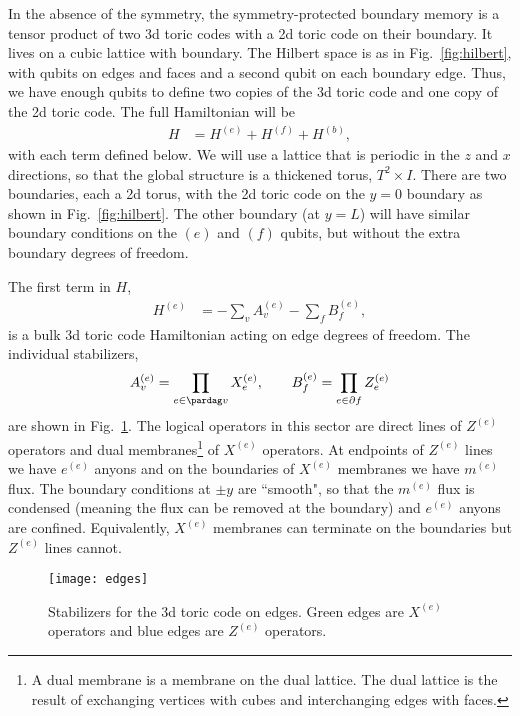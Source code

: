 In the absence of the symmetry, the symmetry-protected boundary memory is a tensor product of two 3d toric codes with a 2d toric code on their boundary. It lives on a cubic lattice with boundary. 
The Hilbert space is as in Fig.~\ref{fig:hilbert}, with qubits on edges and faces and a second qubit on each boundary edge. Thus, we have enough qubits to define two copies of the 3d toric code and one copy of the 2d toric code. The full Hamiltonian will be
\begin{align}
H &= H^{(e)} + H^{(f)} + H^{(b)}, \label{eq:fullH}
\end{align}
with each term defined below. We will use a lattice that is periodic in the $z$ and $x$ directions, so that the global structure is a thickened torus, $T^2\times I$. There are two boundaries, each a 2d torus, with the 2d toric code on the $y=0$ boundary as shown in Fig.~\ref{fig:hilbert}. The other boundary (at $y=L$) will have similar boundary conditions on the $(e)$ and $(f)$ qubits, but without the extra boundary degrees of freedom.

The first term in $H$,
\begin{align}
H^{(e)} &= -\sum_vA_v^{(e)} - \sum_f B_f^{(e)},
\end{align}
is a bulk 3d toric code Hamiltonian acting on edge degrees of freedom. The individual stabilizers,  
\begin{align}
A_v^{(e)} = \prod_{e\in\pardag v}X_e^{(e)},\qquad B_f^{(e)} = \prod_{e\in\partial f} Z_e^{(e)}
\end{align}
are shown in Fig.~\ref{fig:edges}.  The logical operators in this sector are direct lines of $Z^{(e)}$ operators and dual membranes\footnote{A dual membrane is a membrane on the dual lattice. The dual lattice is the result of exchanging vertices with cubes and interchanging edges with faces.} of $X^{(e)}$ operators. At endpoints of $Z^{(e)}$ lines we have $e^{(e)}$ anyons and on the boundaries of $X^{(e)}$ membranes we have $m^{(e)}$ flux. The boundary conditions at $\pm y$ are ``smooth", so that the $m^{(e)}$ flux is condensed (meaning the flux can be removed at the boundary) and $e^{(e)}$ anyons are confined. Equivalently, $X^{(e)}$ membranes can terminate on the boundaries but $Z^{(e)}$ lines cannot.

\begin{figure}[h]
\centering
\texttt{[image: edges]}
\caption[Stabilizers for the 3d toric code on edges]{Stabilizers for the 3d toric code on edges. Green edges are $X^{(e)}$ operators and blue edges are $Z^{(e)}$ operators.}
\label{fig:edges}
\end{figure}

